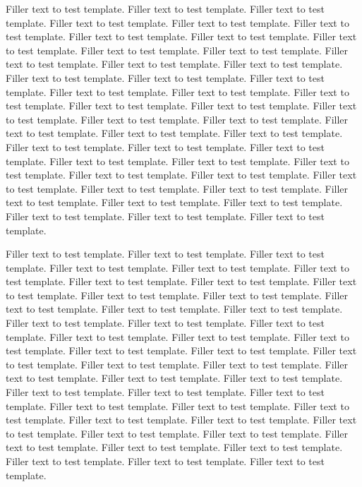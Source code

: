 Filler text to test template. Filler text to test template. Filler text to
test template. Filler text to test template. Filler text to test template.
Filler text to test template. Filler text to test template. Filler text to
test template. Filler text to test template. Filler text to test template.
Filler text to test template. Filler text to test template. Filler text to
test template. Filler text to test template. Filler text to test template.
Filler text to test template. Filler text to test template. Filler text to
test template. Filler text to test template. Filler text to test template.
Filler text to test template. Filler text to test template. Filler text to
test template. Filler text to test template. Filler text to test template.
Filler text to test template. Filler text to test template. Filler text to
test template. Filler text to test template. Filler text to test template.
Filler text to test template. Filler text to test template. Filler text to
test template. Filler text to test template. Filler text to test template.
Filler text to test template. Filler text to test template. Filler text to
test template. Filler text to test template. Filler text to test template.
Filler text to test template. Filler text to test template. Filler text to
test template. Filler text to test template. Filler text to test template.

Filler text to test template. Filler text to test template. Filler text to
test template. Filler text to test template. Filler text to test template.
Filler text to test template. Filler text to test template. Filler text to
test template. Filler text to test template. Filler text to test template.
Filler text to test template. Filler text to test template. Filler text to
test template. Filler text to test template. Filler text to test template.
Filler text to test template. Filler text to test template. Filler text to
test template. Filler text to test template. Filler text to test template.
Filler text to test template. Filler text to test template. Filler text to
test template. Filler text to test template. Filler text to test template.
Filler text to test template. Filler text to test template. Filler text to
test template. Filler text to test template. Filler text to test template.
Filler text to test template. Filler text to test template. Filler text to
test template. Filler text to test template. Filler text to test template.
Filler text to test template. Filler text to test template. Filler text to
test template. Filler text to test template. Filler text to test template.
Filler text to test template. Filler text to test template. Filler text to
test template. Filler text to test template. Filler text to test template.


